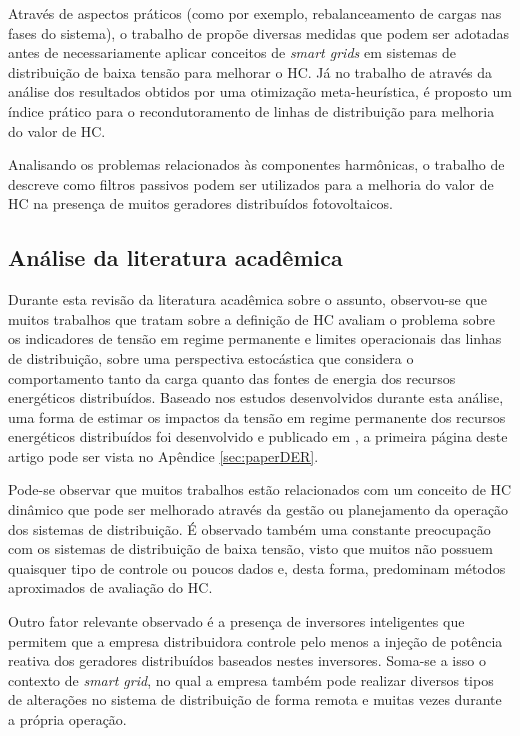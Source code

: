 Através de aspectos práticos (como por exemplo, rebalanceamento de cargas nas fases do sistema), o trabalho de  propõe diversas medidas que podem ser adotadas antes de necessariamente aplicar conceitos de \textit{smart grids} em sistemas de distribuição de baixa tensão para melhorar o HC. Já no trabalho de  através da análise dos resultados obtidos por uma otimização meta-heurística, é proposto um índice prático para o recondutoramento de linhas de distribuição para melhoria do valor de HC.

Analisando os problemas relacionados às componentes harmônicas, o trabalho de  descreve como filtros passivos podem ser utilizados para a melhoria do valor de HC na presença de muitos geradores distribuídos fotovoltaicos.

\subsection{Análise da literatura acadêmica}

Durante esta revisão da literatura acadêmica sobre o assunto, observou-se que muitos trabalhos que tratam sobre a definição de HC avaliam o problema sobre os indicadores de tensão em regime permanente e limites operacionais das linhas de distribuição, sobre uma perspectiva estocástica que considera o comportamento tanto da carga quanto das fontes de energia dos recursos energéticos distribuídos. Baseado nos estudos desenvolvidos durante esta análise, uma forma de estimar os impactos da tensão em regime permanente dos recursos energéticos distribuídos foi desenvolvido e publicado em \cite{MONTEIRO2023109190}, a primeira página deste artigo pode ser vista no Apêndice \ref{sec:paperDER}. 

Pode-se observar que muitos trabalhos estão relacionados com um conceito de HC dinâmico que pode ser melhorado através da gestão ou planejamento da operação dos sistemas de distribuição. É observado também uma constante preocupação com os sistemas de distribuição de baixa tensão, visto que muitos não possuem quaisquer tipo de controle ou poucos dados e, desta forma, predominam métodos aproximados de avaliação do HC.

Outro fator relevante observado é a presença de inversores inteligentes que permitem que a empresa distribuidora controle pelo menos a injeção de potência reativa dos geradores distribuídos baseados nestes inversores. Soma-se a isso o contexto de \textit{smart grid}, no qual a empresa também pode realizar diversos tipos de alterações no sistema de distribuição de forma remota e muitas vezes durante a própria operação.

